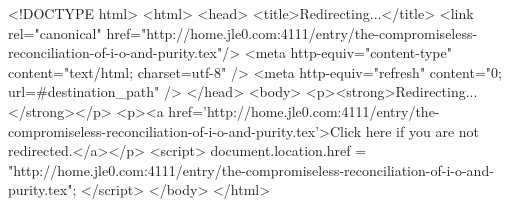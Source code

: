 <!DOCTYPE html>
<html>
<head>
<title>Redirecting...</title>
<link rel="canonical" href="http://home.jle0.com:4111/entry/the-compromiseless-reconciliation-of-i-o-and-purity.tex"/>
<meta http-equiv="content-type" content="text/html; charset=utf-8" />
<meta http-equiv="refresh" content="0; url=#{destination_path}" />
</head>
<body>
  <p><strong>Redirecting...</strong></p>
  <p><a href='http://home.jle0.com:4111/entry/the-compromiseless-reconciliation-of-i-o-and-purity.tex'>Click here if you are not redirected.</a></p>
  <script>
    document.location.href = "http://home.jle0.com:4111/entry/the-compromiseless-reconciliation-of-i-o-and-purity.tex";
  </script>
</body>
</html>
